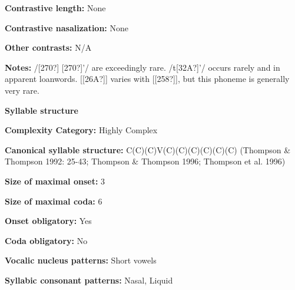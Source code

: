 \begin{styleBody}
\textbf{Contrastive length:} None
\end{styleBody}

\begin{styleBody}
\textbf{Contrastive nasalization:} None
\end{styleBody}

\begin{styleBody}
\textbf{Other contrasts:} N/A
\end{styleBody}

\begin{styleBody}
\textbf{Notes:} /[270?] [270?]’/ are exceedingly rare. /t[32A?]’/ occurs rarely and in apparent loanwords. [[26A?]] varies with [[258?]], but this phoneme is generally very rare.
\end{styleBody}

\begin{styleBody}
\textbf{Syllable structure}
\end{styleBody}

\begin{styleBody}
\textbf{Complexity Category:} Highly Complex
\end{styleBody}

\begin{styleBody}
\textbf{Canonical syllable structure:} C(C)(C)V(C)(C)(C)(C)(C)(C)\textbf{ }(Thompson \& Thompson 1992: 25-43; Thompson \& Thompson 1996; Thompson et al. 1996)
\end{styleBody}

\begin{styleBody}
\textbf{Size of maximal onset:} 3
\end{styleBody}

\begin{styleBody}
\textbf{Size of maximal coda:} 6
\end{styleBody}

\begin{styleBody}
\textbf{Onset obligatory:} Yes
\end{styleBody}

\begin{styleBody}
\textbf{Coda obligatory:} No
\end{styleBody}

\begin{styleBody}
\textbf{Vocalic nucleus patterns:} Short vowels
\end{styleBody}

\begin{styleBody}
\textbf{Syllabic consonant patterns:} Nasal, Liquid
\end{styleBody}

